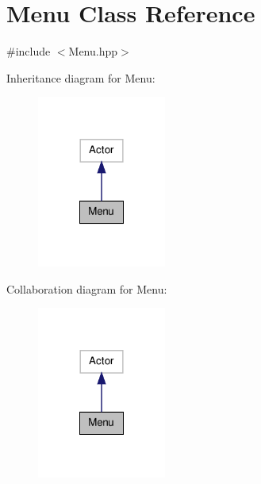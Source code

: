 \hypertarget{class_menu}{\section{Menu Class Reference}
\label{class_menu}
}


{\ttfamily \#include $<$Menu.\-hpp$>$}



Inheritance diagram for Menu\-:
\nopagebreak
\begin{figure}[H]
\begin{center}
\leavevmode
\includegraphics[width=120pt]{class_menu__inherit__graph}
\end{center}
\end{figure}


Collaboration diagram for Menu\-:
\nopagebreak
\begin{figure}[H]
\begin{center}
\leavevmode
\includegraphics[width=120pt]{class_menu__coll__graph}
\end{center}
\end{figure}
